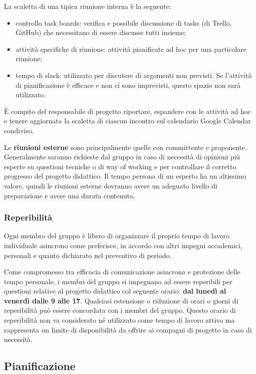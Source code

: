 La scaletta di una tipica riunione interna è la seguente:
\begin{itemize}
  \item controllo task boards: verifica e possibile discussione di tasks (di Trello, GitHub) che necessitano di essere discusse tutti insieme;
  \item attività specifiche di riunione: attività pianificate ad hoc per una particolare riunione;
  \item tempo di slack: utilizzato per discutere di argomenti non previsti. Se l'attività di pianificazione è efficace e non ci sono imprevisti, questo spazio non sarà utilizzato.
\end{itemize}
È compito del responsabile di progetto riportare, espandere con le attività ad hoc e tenere aggiornata la scaletta di ciascun incontro sul calendario Google Calendar condiviso.

Le \textbf{riunioni esterne} sono principalmente quelle con committente e proponente. Generalmente saranno richieste dal gruppo in caso di necessità di opinioni più esperte su questioni tecniche o di way of working e per controllare il corretto progresso del progetto didattico. Il tempo persona di un esperto ha un altissimo valore, quindi le riunioni esterne dovranno avere un adeguato livello di preparazione e avere una durata contenuta. 

\subsubsection{Reperibilità}
Ogni membro del gruppo è libero di organizzare il proprio tempo di lavoro individuale asincrono come preferisce, in accordo con altri impegni accademici, personali e quanto dichiarato nel preventivo di periodo.

Come compromesso tra efficacia di comunicazione asincrona e protezione delle tempo personale, i membri del gruppo si impegnano ad essere reperibili per questioni relative al progetto didattico col seguente orario: \textbf{dal lunedì al venerdì dalle 9 alle 17}. Qualsiasi estensione o riduzione di orari o giorni di reperibilità può essere concordata con i membri del gruppo. Questo orario di reperibilità non va considerato né utilizzato come tempo di lavoro attivo ma rappresenta un limite di disponibilità da offrire ai compagni di progetto in caso di necessità.

\subsection{Pianificazione}

